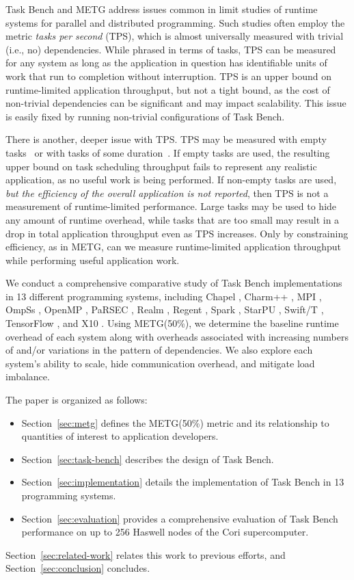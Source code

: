 Task Bench and METG address issues common in limit studies of runtime
systems for parallel and distributed programming. Such studies often
employ the metric \emph{tasks per second} (TPS), which is almost
universally measured with trivial (i.e., no) dependencies. While
phrased in terms of tasks, TPS can be measured for any system as long
as the application in question has identifiable units of work that run
to completion without interruption. TPS is an upper bound on
runtime-limited application throughput, but not a tight bound, as the
cost of non-trivial dependencies can be significant and may impact
scalability. This issue is easily fixed by running non-trivial
configurations of Task Bench.

There is another, deeper issue with TPS. TPS may be measured with
empty tasks~\cite{LegionTracing18} or with tasks of some
duration~\cite{Canary16, Armstrong14}. If empty tasks are used, the
resulting upper bound on task scheduling throughput fails to represent
any realistic application, as no
useful work is being performed. If non-empty tasks are used, \emph{but
  the efficiency of the overall application is not reported}, then TPS
is not a measurement of runtime-limited performance. Large tasks may
be used to hide any amount of runtime overhead,
while tasks that are too small may result in a drop in total
application throughput even as TPS increases. Only by constraining
efficiency, as in METG, can we measure runtime-limited application
throughput while performing useful application work.

We conduct a comprehensive comparative study of Task Bench
implementations in 13 different programming systems, including
Chapel \cite{Chapel07}, Charm++ \cite{Charmpp93}, MPI \cite{MPI},
OmpSs \cite{OmpSs11}, OpenMP \cite{OpenMPSpec40},
PaRSEC \cite{PARSEC13}, Realm \cite{Realm14}, Regent \cite{Regent15},
Spark \cite{Spark10}, StarPU \cite{StarPU11},
Swift/T \cite{Wozniak13}, TensorFlow \cite{TensorFlow15}, and
X10 \cite{X1005}. Using METG(50\%), we determine the baseline
runtime overhead of each system along with overheads associated with
increasing numbers of and/or variations in the pattern of dependencies. We
also explore each system's ability to scale, hide communication
overhead, and mitigate load imbalance.

The paper is organized as follows:

\begin{itemize}
\item Section~\ref{sec:metg} defines the METG(50\%) metric and its
  relationship to quantities of interest to application developers.
\item Section~\ref{sec:task-bench} describes the design of Task Bench.
\item Section~\ref{sec:implementation} details the implementation of
  Task Bench in 13 programming systems.
\item Section~\ref{sec:evaluation} provides a comprehensive evaluation
  of Task Bench performance on up to 256 Haswell nodes of the Cori
  supercomputer.
\end{itemize}

Section~\ref{sec:related-work} relates this work to previous efforts,
and Section~\ref{sec:conclusion} concludes.

